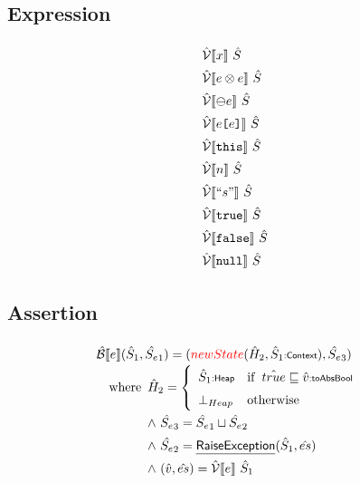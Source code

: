 \subsection{Expression}
\[
\renewcommand\arraystretch{1.5}
\begin{array}{l}

\aV \lbr x \rbr\ \hat{S} \\
\aV \lbr e \inop e \rbr\ \hat{S} \\
\aV \lbr \preop e \rbr\ \hat{S} \\
\aV \lbr e\verb+[+e\verb+]+ \rbr\ \hat{S} \\
\aV \lbr \TT{this} \rbr\ \hat{S} \\
\aV \lbr n \rbr\ \hat{S} \\
\aV \lbr ``s" \rbr\ \hat{S} \\
\aV \lbr \TT{true} \rbr\ \hat{S} \\
\aV \lbr \TT{false} \rbr\ \hat{S} \\
\aV \lbr \TT{null} \rbr\ \hat{S} \\

\end{array}
\]

\subsection{Assertion}
\[
\renewcommand\arraystretch{1.5}
\begin{array}{l}

\aB \lbr e \rbr (\hat{S}_1, \hat{S_e}_1) 
    = ({\inred new State}(\hat{H}_2, \hat{S}_1\tsf{:Context}), \hat{S_e}_3) \\
\quad\wherec{
    \hat{H}_2 = \left \{
	\begin{array}{ll}
        \hat{S}_1\tsf{:Heap} & \ifc{\hat{true} \sqsubseteq \hat{v}\tsf{:toAbsBool}} \\
	    \bot_{Heap} & \owc
    \end{array}  \right.\\
    \land\ \hat{S_e}_3 = \hat{S_e}_1 \sqcup \hat{S_e}_2 \\
    \land\ \hat{S_e}_2 = \chf{RaiseException}(\hat{S}_1, \hat{es}) \\
	\land\ (\hat{v}, \hat{es}) = \aV \lbr e \rbr\ \hat{S}_1
}\\\\

\end{array}
\]

